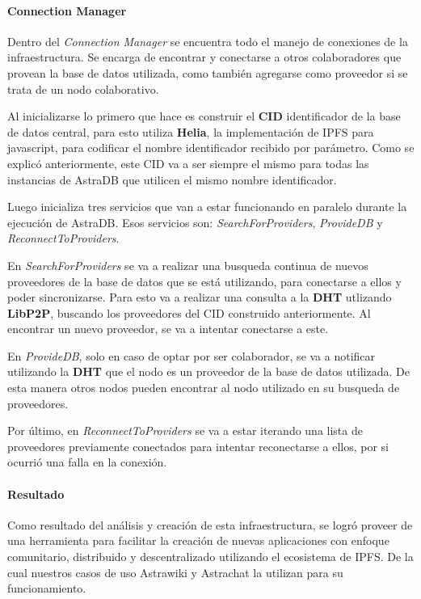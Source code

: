 \paragraph{Connection Manager}

Dentro del \textit{Connection Manager} se encuentra todo el manejo de conexiones de la infraestructura. Se encarga de encontrar y conectarse a otros colaboradores que provean la base de datos utilizada, como también agregarse como proveedor si se trata de un nodo colaborativo.

Al inicializarse lo primero que hace es construir el \textbf{CID} identificador de la base de datos central, para esto utiliza \textbf{Helia}\cite{helia}, la implementación de IPFS para javascript, para codificar el nombre identificador recibido por parámetro. Como se explicó anteriormente, este CID va a ser siempre el mismo para todas las instancias de AstraDB que utilicen el mismo nombre identificador.

Luego inicializa tres servicios que van a estar funcionando en paralelo durante la ejecución de AstraDB. Esos servicios son: \textit{SearchForProviders}, \textit{ProvideDB} y \textit{ReconnectToProviders}.

En \textit{SearchForProviders} se va a realizar una busqueda continua de nuevos proveedores de la base de datos que se está utilizando, para conectarse a ellos y poder sincronizarse. Para esto va a realizar una consulta a la \textbf{DHT} utlizando \textbf{LibP2P}\cite{libp2p}, buscando los proveedores del CID construido anteriormente. Al encontrar un nuevo proveedor, se va a intentar conectarse a este.

En \textit{ProvideDB}, solo en caso de optar por ser colaborador, se va a notificar utilizando la \textbf{DHT} que el nodo es un proveedor de la base de datos utilizada. De esta manera otros nodos pueden encontrar al nodo utilizado en su busqueda de proveedores.

Por último, en \textit{ReconnectToProviders} se va a estar iterando una lista de proveedores previamente conectados para intentar reconectarse a ellos, por si ocurrió una falla en la conexión.

\paragraph{Resultado}

Como resultado del análisis y creación de esta infraestructura, se logró proveer de una herramienta para facilitar la creación de nuevas aplicaciones con enfoque comunitario, distribuido y descentralizado utilizando el ecosistema de IPFS. De la cual nuestros casos de uso Astrawiki y Astrachat la utilizan para su funcionamiento.

